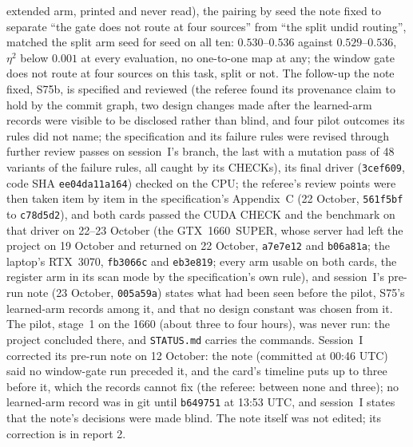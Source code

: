 \documentclass[11pt]{article}
\begin{document}
extended arm, printed and never read), the pairing by seed the note fixed to separate ``the gate does not route at four sources'' from ``the split undid routing'', matched the split arm seed for seed on all ten: $0.530$--$0.536$ against $0.529$--$0.536$, $\eta^2$ below $0.001$ at every evaluation, no one-to-one map at any; the window gate does not route at four sources on this task, split or not. The follow-up the note fixed, S75b, is specified and reviewed (the referee found its provenance claim to hold by the commit graph, two design changes made after the learned-arm records were visible to be disclosed rather than blind, and four pilot outcomes its rules did not name; the specification and its failure rules were revised through further review passes on session~I's branch, the last with a mutation pass of 48 variants of the failure rules, all caught by its CHECKs), its final driver (\texttt{3cef609}, code SHA \texttt{ee04da11a164}) checked on the CPU; the referee's review points were then taken item by item in the specification's Appendix~C (22 October, \texttt{561f5bf} to \texttt{c78d5d2}), and both cards passed the CUDA CHECK and the benchmark on that driver on 22--23 October (the GTX~1660~SUPER, whose server had left the project on 19 October and returned on 22 October, \texttt{a7e7e12} and \texttt{b06a81a}; the laptop's RTX~3070, \texttt{fb3066c} and \texttt{eb3e819}; every arm usable on both cards, the register arm in its scan mode by the specification's own rule), and session~I's pre-run note (23 October, \texttt{005a59a}) states what had been seen before the pilot, S75's learned-arm records among it, and that no design constant was chosen from it. The pilot, stage~1 on the 1660 (about three to four hours), was never run: the project concluded there, and \texttt{STATUS.md} carries the commands. Session~I corrected its pre-run note on 12 October: the note (committed at 00:46 UTC) said no window-gate run preceded it, and the card's timeline puts up to three before it, which the records cannot fix (the referee: between none and three); no learned-arm record was in git until \texttt{b649751} at 13:53 UTC, and session~I states that the note's decisions were made blind. The note itself was not edited; its correction is in report 2.
\end{document}
